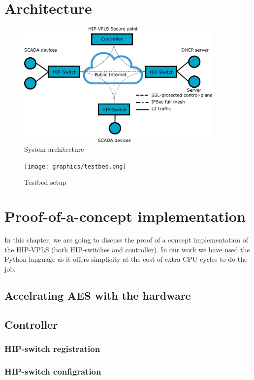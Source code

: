 \chapter{Architecture}

\begin{figure}[h!]
\centering
\includegraphics[width=0.9\textwidth]{graphics/arch.png}
\caption{System architecture}
\label{fig:architecture}
\end{figure}       


\begin{figure}[h!]
\centering
\texttt{[image: graphics/testbed.png]}
\caption{Testbed setup}
\label{fig:testbed}
\end{figure}       
    
\chapter{Proof-of-a-concept implementation}
In this chapter, we are going to discuss the proof of a concept
implementation of the HIP-VPLS (both HIP-switches and controller). 
In our work we have used the Python language as it offers simplicity
at the cost of extra CPU cycles to do the job.

\section{Accelrating AES with the hardware}

\section{Controller}
\subsection{HIP-switch registration}
\subsection{HIP-switch configration}
